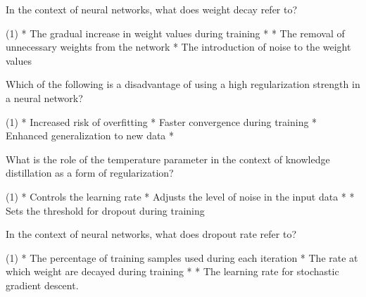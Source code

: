 \documentclass[10pt]{extarticle}
\begin{document}
\begin{exercise}
    In the context of neural networks, what does weight decay refer to?
    \begin{choice} (1)
        * The gradual increase in weight values during training
        * 
        * The removal of unnecessary weights from the network
        * The introduction of noise to the weight values
    \end{choice}
\end{exercise}
\begin{solution}
\end{solution}

\begin{exercise}
    Which of the following is a disadvantage of using a high regularization strength in a neural network?
    \begin{choice} (1)
        * Increased risk of overfitting
        * Faster convergence during training
        * Enhanced generalization to new data
        * 
    \end{choice}
\end{exercise}
\begin{solution}
\end{solution}

\begin{exercise}
    What is the role of the temperature parameter in the context of knowledge distillation as a form of regularization?
    \begin{choice} (1)
        * Controls the learning rate
        * Adjusts the level of noise in the input data
        * 
        * Sets the threshold for dropout during training
    \end{choice}
\end{exercise}
\begin{solution}
\end{solution}

\begin{exercise}
    In the context of neural networks, what does dropout rate refer to?
    \begin{choice}(1)
        * The percentage of training samples used during each iteration
        * The rate at which weight are decayed during training
        * 
        * The learning rate for stochastic gradient descent.
    \end{choice}
\end{exercise}
\begin{solution}
\end{solution}
\end{document}
